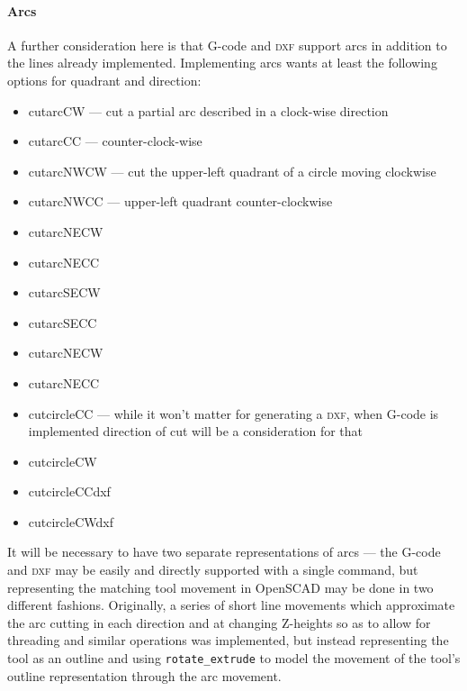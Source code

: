 \documentclass{ltxdoc}
\begin{document}
\paragraph{Arcs}
 
A further consideration here is that G-code and \textsc{dxf} support arcs in addition to the lines already implemented. Implementing arcs wants at least the following options for quadrant and direction:
 
\begin{itemize}
\item cutarcCW --- cut a partial arc described in a clock-wise direction
\item cutarcCC --- counter-clock-wise
\item cutarcNWCW --- cut the upper-left quadrant of a circle moving clockwise
\item cutarcNWCC --- upper-left quadrant counter-clockwise
\item cutarcNECW
\item cutarcNECC
\item cutarcSECW
\item cutarcSECC
\item cutarcNECW
\item cutarcNECC
\item cutcircleCC --- while it won't matter for generating a \textsc{dxf}, when G-code is implemented direction of cut will be a consideration for that
\item cutcircleCW
\item cutcircleCCdxf
\item cutcircleCWdxf
\end{itemize}
 
It will be necessary to have two separate representations of arcs --- the G-code and \textsc{dxf} may be easily and directly supported with a single command, but representing the matching tool movement in OpenSCAD may be done in two different fashions. Originally, a series of short line movements which approximate the arc cutting in each direction and at changing Z-heights so as to allow for threading and similar operations was implemented, but instead representing the tool as an outline and using \verb|rotate_extrude| to model the movement of the tool's outline representation through the arc movement.


 
\end{document}
